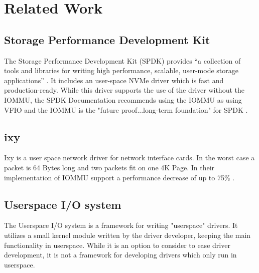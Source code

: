 \chapter{Related Work}

\section{Storage Performance Development Kit}
The Storage Performance Development Kit (SPDK) provides ``a collection of tools and libraries for writing high performance, scalable, user-mode storage applications'' \cite{spdkindex}. It includes an user-space NVMe driver which is fast and production-ready. While this driver supports the use of the driver without the IOMMU, the SPDK Documentation recommends using the IOMMU as using VFIO and the IOMMU is the "future proof...long-term foundation" for SPDK \cite{spdkmemory}.

\section{ixy} \label{s:ixy}
Ixy is a user space network driver for network interface cards. In the worst case a packet is 64 Bytes long and two packets fit on one 4K Page. In their implementation of IOMMU support a performance decrease of up to 75\% \cite{iommuhuber}.

\section{Userspace I/O system}
The Userspace I/O system is a framework for writing "userspace" drivers. It utilizes a small kernel module written by the driver developer, keeping the main functionality in userspace. While it is an option to consider to ease driver development, it is not a framework for developing drivers which only run in userspace.